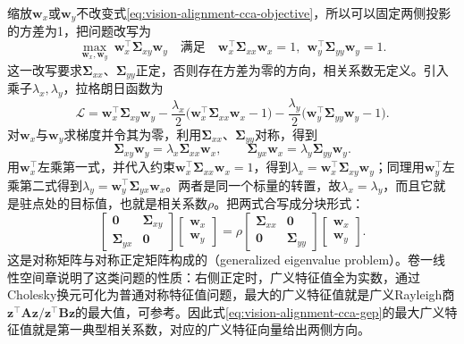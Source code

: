 缩放$\bm w_x$或$\bm w_y$不改变式\eqref{eq:vision-alignment-cca-objective}，所以可以固定两侧投影的方差为1，把问题改写为
\[
  \max_{\bm w_x,\bm w_y}\ \bm w_x^\top\bm\Sigma_{xy}\bm w_y
  \quad\text{满足}\quad
  \bm w_x^\top\bm\Sigma_{xx}\bm w_x=1,\ \
  \bm w_y^\top\bm\Sigma_{yy}\bm w_y=1.
\]
这一改写要求$\bm\Sigma_{xx}$、$\bm\Sigma_{yy}$正定，否则存在方差为零的方向，相关系数无定义。引入乘子$\lambda_x,\lambda_y$，拉格朗日函数为
\[
  \mathcal L=\bm w_x^\top\bm\Sigma_{xy}\bm w_y
   -\frac{\lambda_x}{2}\bigl(\bm w_x^\top\bm\Sigma_{xx}\bm w_x-1\bigr)
   -\frac{\lambda_y}{2}\bigl(\bm w_y^\top\bm\Sigma_{yy}\bm w_y-1\bigr).
\]
对$\bm w_x$与$\bm w_y$求梯度并令其为零，利用$\bm\Sigma_{xx}$、$\bm\Sigma_{yy}$对称，得到
\begin{equation}
  \bm\Sigma_{xy}\bm w_y=\lambda_x\bm\Sigma_{xx}\bm w_x,\qquad
  \bm\Sigma_{yx}\bm w_x=\lambda_y\bm\Sigma_{yy}\bm w_y.
  \label{eq:vision-alignment-cca-stationary}
\end{equation}
用$\bm w_x^\top$左乘第一式，并代入约束$\bm w_x^\top\bm\Sigma_{xx}\bm w_x=1$，得到$\lambda_x=\bm w_x^\top\bm\Sigma_{xy}\bm w_y$；同理用$\bm w_y^\top$左乘第二式得到$\lambda_y=\bm w_y^\top\bm\Sigma_{yx}\bm w_x$。两者是同一个标量的转置，故$\lambda_x=\lambda_y$，而且它就是驻点处的目标值，也就是相关系数$\rho$。把两式合写成分块形式：
\begin{equation}
  \begin{bmatrix}\bm 0&\bm\Sigma_{xy}\\ \bm\Sigma_{yx}&\bm 0\end{bmatrix}
  \begin{bmatrix}\bm w_x\\ \bm w_y\end{bmatrix}
  =\rho
  \begin{bmatrix}\bm\Sigma_{xx}&\bm 0\\ \bm 0&\bm\Sigma_{yy}\end{bmatrix}
  \begin{bmatrix}\bm w_x\\ \bm w_y\end{bmatrix}.
  \label{eq:vision-alignment-cca-gep}
\end{equation}
这是对称矩阵与对称正定矩阵构成的（generalized eigenvalue problem）。卷一线性空间章说明了这类问题的性质：右侧正定时，广义特征值全为实数，通过Cholesky换元可化为普通对称特征值问题，最大的广义特征值就是广义Rayleigh商$\bm z^\top\bm A\bm z/\bm z^\top\bm B\bm z$的最大值，可参考。因此式\eqref{eq:vision-alignment-cca-gep}的最大广义特征值就是第一典型相关系数，对应的广义特征向量给出两侧方向。

